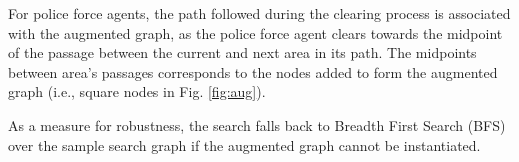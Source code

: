 For police force agents, the path followed during the clearing process is associated with the augmented graph, as the police force agent clears towards the midpoint of the passage between the current and next area in its path. The midpoints between area's passages corresponds to the nodes added to form the augmented graph (i.e., square nodes in Fig. \ref{fig:aug}).

As a measure for robustness, the search falls back to Breadth First Search (BFS) over the sample search graph if the augmented graph cannot be instantiated. 

%
%
